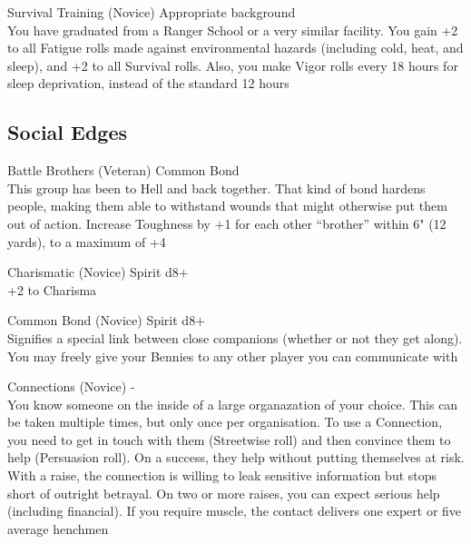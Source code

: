 \begin{multicols}{2}
\begin{genericsection}{Survival Training (Novice)}
Appropriate background\\
You have graduated from a Ranger School or a very similar facility. You gain +2 to all Fatigue rolls made against environmental hazards (including cold, heat, and sleep), and +2 to all Survival rolls. Also, you make Vigor rolls every 18 hours for sleep deprivation, instead of the standard 12 hours
\end{genericsection}


%
%
\subsection{Social Edges}

\begin{genericsection}{Battle Brothers (Veteran)}
Common Bond\\
This group has been to Hell and back together. That kind of bond hardens people, making them able to withstand wounds that might otherwise put them out of action. Increase Toughness by +1 for each other “brother” within 6" (12 yards), to a maximum of +4
\end{genericsection}

\begin{genericsection}{Charismatic (Novice)}
Spirit d8+\\
+2 to Charisma
\end{genericsection}

\begin{genericsection}{Common Bond (Novice)}
Spirit d8+\\
Signifies a special link between close companions (whether or not they get along). You may freely give your Bennies to any other player you can communicate with
\end{genericsection}

\begin{genericsection}{Connections (Novice)}
-\\
You know someone on the inside of a large organazation of your choice. This can be taken multiple times, but only once per organisation. To use a Connection, you need to get in touch with them (Streetwise roll) and then convince them to help (Persuasion roll). On a success, they help without putting themselves at risk. With a raise, the connection is willing to leak sensitive information but stops short of outright betrayal. On two or more raises, you can expect serious help (including financial). If you require muscle, the contact delivers one expert or five average henchmen
\end{genericsection}


\end{multicols}
